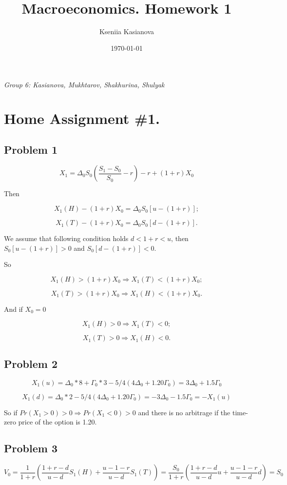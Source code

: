 \documentclass[a4paper,12pt]{article} %
\author{Kseniia Kasianova}
\title{Macroeconomics. Homework 1}
\date{\today}
\newcommand{\latinword}[1]{\textsf{\itshape #1}}%
\begin{document}
{ \latinword{Group 6: Kasianova, Mukhtarov, Shakhurina, Shulyak}}

\noindent\makebox[\linewidth]{\rule{\textwidth}{0.4pt}}


\section*{Home Assignment \#1.}
\subsection*{Problem 1}

$$X_1 = \Delta_0 S_0 \left( \dfrac{S_1-S_0}{S_0} - r \right)− r + (1 + r)X_0$$

Then

$$X_1 (H) − (1 + r)X_0 = \Delta_0 S_0 [u − (1 + r)];$$

$$X_1 (T ) − (1 + r)X_0 = \Delta_0 S_0 [d − (1 + r)].$$

We assume that following condition holds $d < 1 + r < u$, then $S_0 [u − (1 + r)] > 0$ and $S_0 [d − (1 + r)]<0$. 

So

$$X_1 (H) > (1+r)X_0 \Rightarrow X_1 (T ) < (1+r)X_0; $$

$$X_1 (T ) > (1+r)X_0 \Rightarrow X_1 (H) < (1+r)X_0. $$

And if   $X_0 = 0$

$$X_1 (H) > 0 \Rightarrow X_1 (T ) < 0; $$

$$X_1 (T ) > 0 \Rightarrow X_1 (H) < 0.  $$



\subsection*{Problem 2}




$$X_1 (u) = \Delta_0 * 8 + \Gamma_0 * 3 - 5/4 (4 \Delta_0 + 1.20\Gamma_0 ) = 3 \Delta_0 + 1.5\Gamma_0$$ 

$$X_1 (d) = \Delta_0 * 2  - 5/4 (4 \Delta_0 + 1.20\Gamma_0 ) = - 3 \Delta_0 - 1.5\Gamma_0 = - X_1 (u) $$ 

So if $Pr(X_1>0)>0 \Rightarrow Pr(X_1<0)>0 $ and there is no arbitrage if the time-zero price of the option is 1.20.  


\subsection*{Problem 3}


$$ V_0 = \dfrac{1}{1+r} \left( \dfrac{1+r-d}{u-d} S_1(H)  +   \dfrac{u-1-r}{u-d} S_1(T)  \right)  = \dfrac{ S_0}{1+r} \left( \dfrac{1+r-d}{u-d} u  +   \dfrac{u-1-r}{u-d} d    \right) = S_0 $$
\end{document}
